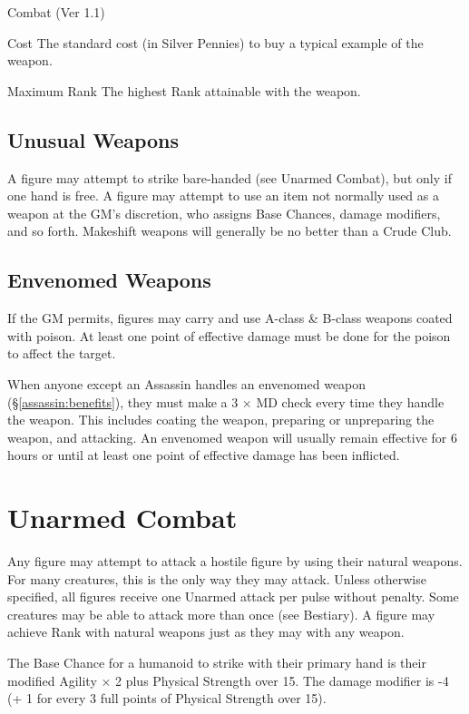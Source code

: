 \begin{Chapter}{Combat (Ver 1.1)}
\begin{Description}
\item[Cost] The standard cost (in Silver Pennies) to buy a typical
  example of the weapon.

\item[Maximum] Rank The highest Rank attainable with the weapon.

\end{Description}
  
\subsection{Unusual Weapons}

A figure may attempt to strike bare-handed (see Unarmed Combat), but
only if one hand is free.  A figure may attempt to use an item not
normally used as a weapon at the GM’s discretion, who assigns Base
Chances, damage modifiers, and so forth.  Makeshift weapons will
generally be no better than a Crude Club.

\subsection{Envenomed Weapons}

If the GM permits, figures may carry and use A-class \& B-class
weapons coated with poison.  At least one point of effective damage
must be done for the poison to affect the target.

When anyone except an Assassin handles an envenomed weapon
(\S\ref{assassin:benefits}), they must make a 3 × MD check every time
they handle the weapon.  This includes coating the weapon, preparing
or unpreparing the weapon, and attacking. An envenomed weapon will
usually remain effective for 6 hours or until at least one point of
effective damage has been inflicted.

\section{Unarmed Combat}
\label{combat:unarmed}

Any figure may attempt to attack a hostile figure by using their
natural weapons.  For many creatures, this is the only way they may
attack. Unless otherwise specified, all figures receive one Unarmed
attack per pulse without penalty.  Some creatures may be able to
attack more than once (see Bestiary). A figure may achieve Rank with
natural weapons just as they may with any weapon.

The Base Chance for a humanoid to strike with their primary hand is
their modified Agility × 2 plus Physical Strength over 15. The damage
modifier is -4 (+ 1 for every 3 full points of Physical Strength over
15).


\end{Chapter}

